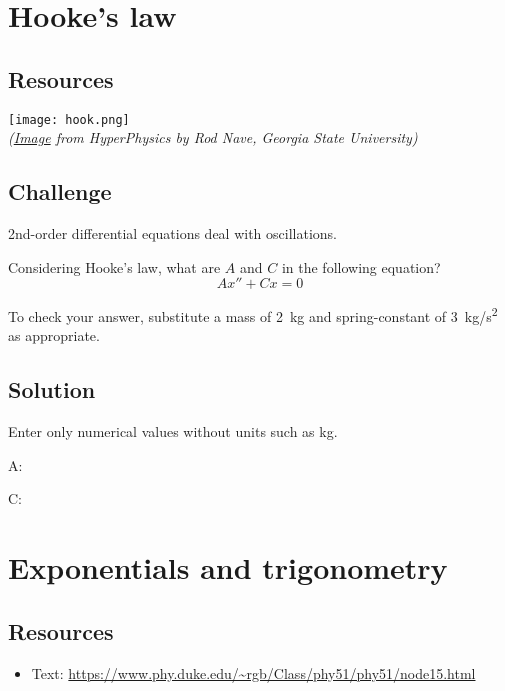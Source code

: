 \section{Hooke's law}
\label{sec:hooke}

\subsection*{Resources}

\texttt{[image: hook.png]}\\
\emph{(\href{http://hyperphysics.phy-astr.gsu.edu/hbase/imgmec/hook.gif}{Image} from HyperPhysics by Rod Nave, Georgia State University)}

\subsection*{Challenge}
2nd-order differential equations deal with oscillations.

Considering Hooke's law, what are $A$ and $C$ in the following equation?
\begin{equation}
    A x'' + C x = 0
\end{equation}

To check your answer, substitute a mass of \SI{2}{kg} and spring-constant of \SI{3}{kg/s^2} as appropriate.

\subsection*{Solution}
Enter only numerical values without units such as kg.

A: 

C: 




\newpage
\section{Exponentials and trigonometry}

\subsection*{Resources}
\begin{itemize}
    \item Text: \url{https://www.phy.duke.edu/~rgb/Class/phy51/phy51/node15.html}
\end{itemize}

